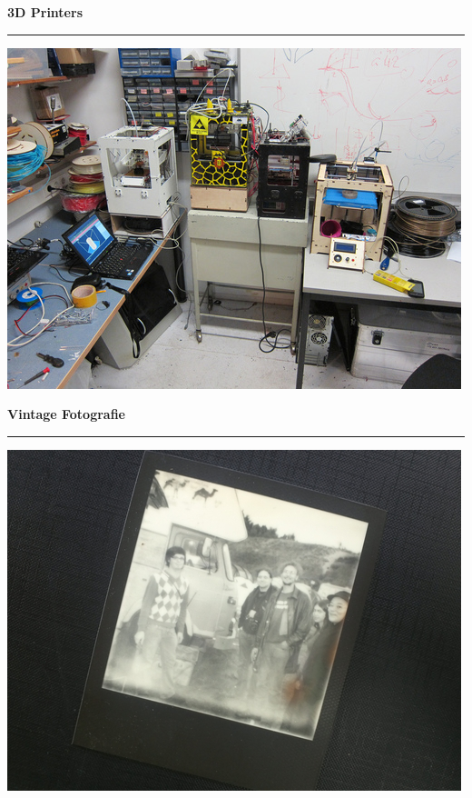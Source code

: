 \documentclass{seminar}
\providecommand{\T}[1]{
	\begin{center}
		{\bf #1}
	\end{center}
	\vspace{2mm}
	\hrule
	\vspace{2mm}
}
\begin{document}
\begin{slide}
	\T{3D Printers}
	\begin{center}
		\includegraphics[scale=0.5]{3d_printers.jpeg}
	\end{center}
\end{slide}

\begin{slide}
	\T{Vintage Fotografie}
	\begin{center}
		\includegraphics[scale=0.5]{polaroid.jpeg}
	\end{center}
\end{slide}
\end{document}
